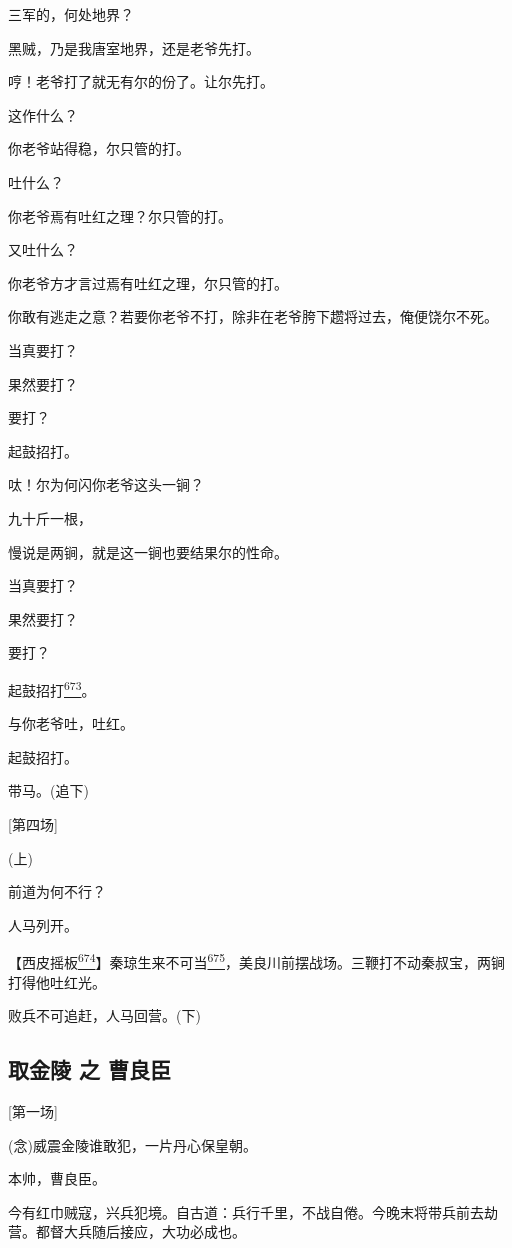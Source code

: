 三军的，何处地界？

黑贼，乃是我唐室地界，还是老爷先打。

哼！老爷打了就无有尔的份了。让尔先打。

这作什么？

你老爷站得稳，尔只管的打。

吐什么？

你老爷焉有吐红之理？尔只管的打。

又吐什么？

你老爷方才言过焉有吐红之理，尔只管的打。

你敢有逃走之意？若要你老爷不打，除非在老爷胯下趱将过去，俺便饶尔不死。

当真要打？

果然要打？

要打？

起鼓招打。

呔！尔为何闪你老爷这头一锏？

九十斤一根，

慢说是两锏，就是这一锏也要结果尔的性命。

当真要打？

果然要打？

要打？

起鼓招打\protect\hyperlink{fn673}{\textsuperscript{673}}。

与你老爷吐，吐红。

起鼓招打。

带马。(追下)

{[}第四场{]}

(上)

前道为何不行？

人马列开。

【西皮摇板\protect\hyperlink{fn674}{\textsuperscript{674}}】秦琼生来不可当\protect\hyperlink{fn675}{\textsuperscript{675}}，美良川前摆战场。三鞭打不动秦叔宝，两锏打得他吐红光。

败兵不可追赶，人马回营。(下)

\hypertarget{ux53d6ux91d1ux9675-ux4e4b-ux66f9ux826fux81e3}{%
\subsection{取金陵 之
曹良臣}\label{ux53d6ux91d1ux9675-ux4e4b-ux66f9ux826fux81e3}}

{[}第一场{]}

(念)威震金陵谁敢犯，一片丹心保皇朝。

本帅，曹良臣。

今有红巾贼寇，兴兵犯境。自古道：兵行千里，不战自倦。今晚末将带兵前去劫营。都督大兵随后接应，大功必成也。


